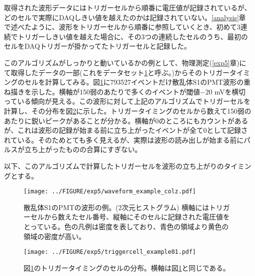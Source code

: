 \documentclass[../../main.tex]{subfiles}
\numberwithin{equation}{section}
\numberwithin{table}{section}
\numberwithin{figure}{section}
\begin{document}
    取得された波形データにはトリガーセルから順番に電圧値が記録されているが、どのセルで実際にDAQしきい値を越えたのかは記録されていない。\ref{analysis}章で述べたように、波形をトリガーセルから順番に参照していくとき、初めて3連続でトリガーしきい値を越えた場合に、その3つの連続したセルのうち、最初のセルをDAQトリガーが掛かってたトリガーセルと記録した。
    
  

    このアルゴリズムがしっかりと動いているかの例として、物理測定(\ref{exp5}章)にて取得したデータの一部(これをデータセット\ref{fig:exp5_waveform_example_colz}と呼ぶ。)からそのトリガータイミングのセルを計算してみる。図\ref{fig:exp5_waveform_example_colz}に793527イベントだけ散乱体S1のPMT波形の重ね描きを示した。横軸が150弱のあたりで多くのイベントが閾値$-20$ \si{\milli\volt}を横切っている傾向が見える。この波形に対して上記のアルゴリズムでトリガーセルを計算し、その分布を図\ref{fig:exp5_triggercell_example01}に示した。トリガータイミングのセルから数えて150弱のあたりに鋭いピークがあることが分かる。横軸が0のところにもカウントがあるが、これは波形の記録が始まる前に立ち上がったイベントが全て0として記録されている。そのためとても多く見えるが、実際は波形の読み出しが始まる前にパルスが立ち上がったものの合算にすぎない。


    以下、このアルゴリズムで計算したトリガーセルを波形の立ち上がりのタイミングとする。
    \begin{figure}[tbp]
      \centering
      \texttt{[image: ../FIGURE/exp5/waveform\_example\_colz.pdf]}
      \caption{散乱体S1のPMTの波形の例。(2次元ヒストグラム) 横軸にはトリガーセルから数えたセル番号、縦軸にそのセルに記録された電圧値をとっている。色の凡例は密度を表しており、青色の領域より黄色の領域の密度が高い。}
      \label{fig:exp5_waveform_example_colz}
    \end{figure}
    \begin{figure}[tbp]
      \centering
      \texttt{[image: ../FIGURE/exp5/triggercell\_example01.pdf]}
      \caption{図\ref{fig:exp5_waveform_example_colz}のトリガータイミングのセルの分布。横軸は図\ref{fig:exp5_waveform_example_colz}と同じである。}
      \label{fig:exp5_triggercell_example01}
    \end{figure}
\end{document}
